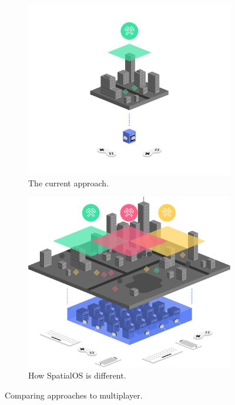 \documentclass[a4paper,12pt,titlepage]{article}
\begin{document}
\begin{figure}[!hbpt]
\centering
\begin{subfigure}{.5\textwidth}
  \centering
  \includegraphics[width=\linewidth]{img/spatialos-diagram_current2.png}
  \caption{The current approach.}
  \label{fig:spatialos-diagram_current2}
\end{subfigure}%
\begin{subfigure}{.5\textwidth}
  \centering
  \includegraphics[width=\linewidth]{img/spatialos-diagram_solution2.png}
  \caption{How SpatialOS is different.}
  \label{fig:spatialos-diagram_solution2}
\end{subfigure}
\caption{Comparing approaches to multiplayer. \cite{ImprobableWorldsLtd.2018b}}
\label{fig:test}
\end{figure}
\end{document}
